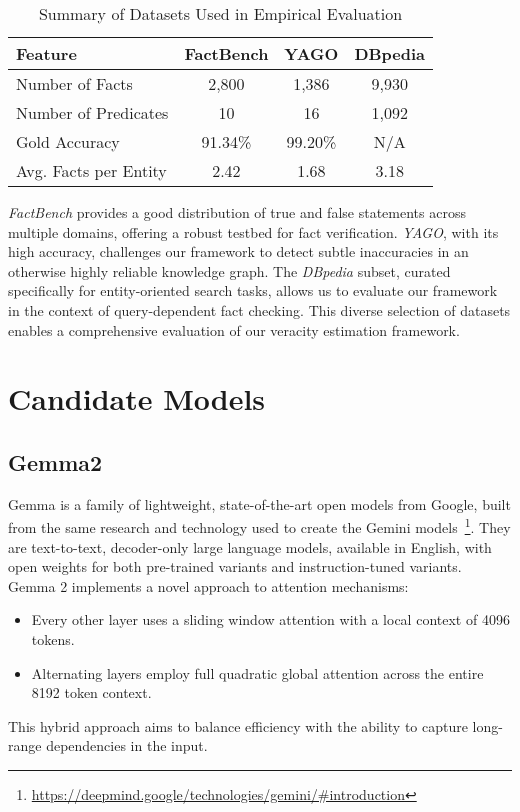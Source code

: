 \begin{table}[h!]
    \centering
    \begin{tabular}{lccc}
        \toprule
        \textbf{Feature} & \textbf{FactBench} & \textbf{YAGO} & \textbf{DBpedia} \\
        \midrule
        Number of Facts & 2,800 & 1,386 & 9,930 \\
        Number of Predicates & 10 & 16 & 1,092 \\
        Gold Accuracy & 91.34\% & 99.20\% & N/A \\
        Avg. Facts per Entity & 2.42 & 1.68 & 3.18 \\
        \bottomrule
    \end{tabular}
    \caption{Summary of Datasets Used in Empirical Evaluation}
    \label{tab:dataset-summary}
\end{table}

\textit{FactBench} provides a good distribution of true and false statements across multiple domains, offering a robust testbed for fact verification.
\textit{YAGO}, with its high accuracy, challenges our framework to detect subtle inaccuracies in an otherwise highly reliable knowledge graph.
The \textit{DBpedia} subset, curated specifically for entity-oriented search tasks, allows us to evaluate our framework in the context of query-dependent fact checking.
This diverse selection of datasets enables a comprehensive evaluation of our veracity estimation framework.

\section{Candidate Models}\label{sec:empirical-evaluation:candidate-models}
\subsection{Gemma2}\label{subsec:empirical-evaluation:candidate-models:gemma2}
Gemma is a family of lightweight, state-of-the-art open models from Google, built from the same research and technology used to create the Gemini models~\footnote{\url{https://deepmind.google/technologies/gemini/#introduction}}.
They are text-to-text, decoder-only large language models, available in English, with open weights for both pre-trained variants and instruction-tuned variants.
Gemma 2 implements a novel approach to attention mechanisms:
\begin{itemize}
    \item Every other layer uses a sliding window attention with a local context of 4096 tokens.
    \item Alternating layers employ full quadratic global attention across the entire 8192 token context.
\end{itemize}
This hybrid approach aims to balance efficiency with the ability to capture long-range dependencies in the input.

